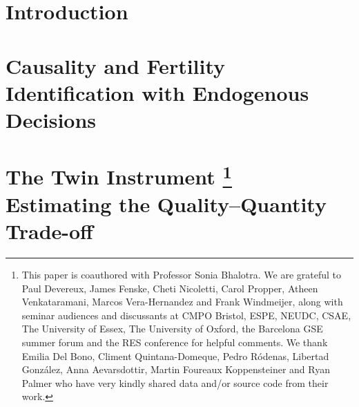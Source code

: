 \documentclass{report}[12pt]
\newcommand{\litrloc}{./literature}
\let\stdsection\thesection
\let\oldchapter\chapter
\renewcommand{\chapter}{\let\thesection\stdsection\oldchapter}
\begin{document}
\newpage
\begin{spacing}{1.4}
\setlength\parindent{0.25in}
\setlength\parskip{0.25in}


\chapter*{Introduction}




\renewcommand*{\thefootnote}{\fnsymbol{footnote}}
\chapter[Causality and Fertilty: Identification with Endogenous Decisions]%
{Causality and Fertility%
\\[2ex]\Large Identification with Endogenous Decisions}
\label{chap:fert}
\renewcommand*{\thefootnote}{\arabic{footnote}}




\renewcommand*{\thefootnote}{\fnsymbol{footnote}}
\chapter[The Twin Instrument and Family Size]%
{The Twin Instrument%
\footnote{This paper is coauthored with Professor Sonia Bhalotra. We are 
grateful to Paul Devereux, James Fenske, Cheti Nicoletti, Carol Propper, Atheen 
Venkataramani, Marcos Vera-Hernandez and Frank Windmeijer, along with seminar 
audiences and discussants at CMPO Bristol, ESPE, NEUDC, CSAE, The University of 
Essex, The University of Oxford, the Barcelona GSE summer forum and the RES 
conference for helpful comments.  We thank Emilia Del Bono, Climent 
Quintana-Domeque, Pedro R\'odenas, Libertad Gonz\'alez, Anna Aevarsdottir, 
Martin Foureaux Koppensteiner and Ryan Palmer who have very kindly shared data 
and/or source code from their work.} 
\\[2ex]\Large Estimating the Quality--Quantity Trade-off}
\label{chap:twins}
\renewcommand*{\thefootnote}{\arabic{footnote}}


\end{spacing}
\end{document}
